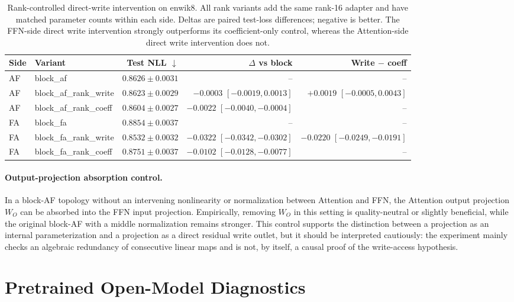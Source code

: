 \documentclass[letterpaper]{article}
\begin{document}
\begin{table}[t]
\centering
\caption{Rank-controlled direct-write intervention on enwik8. All rank
variants add the same rank-16 adapter and have matched parameter counts within
each side. Deltas are paired test-loss differences; negative is better. The
FFN-side direct write intervention strongly outperforms its coefficient-only
control, whereas the Attention-side direct write intervention does not.}
\label{tab:rank-write}
\begin{tabular}{llrrr}
\toprule
Side & Variant & Test NLL $\downarrow$ & $\Delta$ vs block & Write $-$ coeff \\
\midrule
AF & block\_af & $0.8626 \pm 0.0031$ & -- & -- \\
AF & block\_af\_rank\_write & $0.8623 \pm 0.0029$ & $-0.0003$ $[-0.0019,0.0013]$ & $+0.0019$ $[-0.0005,0.0043]$ \\
AF & block\_af\_rank\_coeff & $0.8604 \pm 0.0027$ & $-0.0022$ $[-0.0040,-0.0004]$ & -- \\
\midrule
FA & block\_fa & $0.8854 \pm 0.0037$ & -- & -- \\
FA & block\_fa\_rank\_write & $0.8532 \pm 0.0032$ & $-0.0322$ $[-0.0342,-0.0302]$ & $-0.0220$ $[-0.0249,-0.0191]$ \\
FA & block\_fa\_rank\_coeff & $0.8751 \pm 0.0037$ & $-0.0102$ $[-0.0128,-0.0077]$ & -- \\
\bottomrule
\end{tabular}
\end{table}

\paragraph{Output-projection absorption control.}
In a block-AF topology without an intervening nonlinearity or normalization
between Attention and FFN, the Attention output projection $W_O$ can be absorbed
into the FFN input projection. Empirically, removing $W_O$ in this setting is
quality-neutral or slightly beneficial, while the original block-AF with a
middle normalization remains stronger. This control supports the distinction
between a projection as an internal parameterization and a projection as a
direct residual write outlet, but it should be interpreted cautiously: the
experiment mainly checks an algebraic redundancy of consecutive linear maps and
is not, by itself, a causal proof of the write-access hypothesis.

\section{Pretrained Open-Model Diagnostics}
\end{document}
